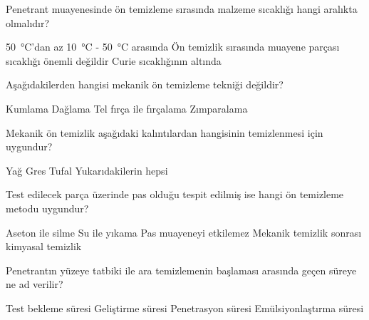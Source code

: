 \begin{question}[subtitle=]
  Penetrant muayenesinde ön temizleme sırasında malzeme sıcaklığı hangi aralıkta olmalıdır?
  \begin{tasks}
    \task \SI{50}{\degreeCelsius}'dan az
    \task \SI{10}{\degreeCelsius} - \SI{50}{\degreeCelsius} arasında
    \task Ön temizlik sırasında muayene parçası sıcaklığı önemli değildir \correct
    \task Curie sıcaklığının altında
  \end{tasks}
\end{question}
\begin{solution}
	\correct
\end{solution}

\begin{question}[subtitle=]
  Aşağıdakilerden hangisi mekanik ön temizleme tekniği değildir?
  \begin{tasks}
    \task Kumlama
    \task Dağlama \correct
    \task Tel fırça ile fırçalama
    \task Zımparalama
  \end{tasks}
\end{question}
\begin{solution}
	\correct
\end{solution}

\begin{question}[subtitle=]
  Mekanik ön temizlik aşağıdaki kalıntılardan hangisinin temizlenmesi için uygundur?
  \begin{tasks}
    \task Yağ
    \task Gres
    \task Tufal \correct
    \task Yukarıdakilerin hepsi
  \end{tasks}
\end{question}
\begin{solution}
	\correct
\end{solution}

\begin{question}[subtitle=]
  Test edilecek parça üzerinde pas olduğu tespit edilmiş ise hangi ön temizleme metodu uygundur?
  \begin{tasks}
    \task Aseton ile silme
    \task Su ile yıkama
    \task Pas muayeneyi etkilemez
    \task Mekanik temizlik sonrası kimyasal temizlik \correct
  \end{tasks}
\end{question}
\begin{solution}
	\correct
\end{solution}

\begin{question}[subtitle=]
  Penetrantın yüzeye tatbiki ile ara temizlemenin başlaması arasında geçen süreye ne ad verilir?
  \begin{tasks}
    \task Test bekleme süresi
    \task Geliştirme süresi
    \task Penetrasyon süresi \correct
    \task Emülsiyonlaştırma süresi
  \end{tasks}
\end{question}
\begin{solution}
	\correct
\end{solution}

